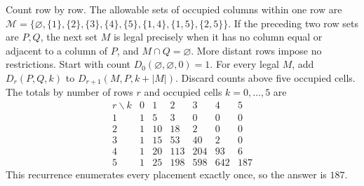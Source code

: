 Count row by row. The allowable sets of occupied columns within one row are $\mathcal M=\{\varnothing,\{1\},\{2\},\{3\},\{4\},\{5\},\{1,4\},\{1,5\},\{2,5\}\}$. If the preceding two row sets are $P,Q$, the next set $M$ is legal precisely when it has no column equal or adjacent to a column of $P$, and $M\cap Q=\varnothing$. More distant rows impose no restrictions. Start with count $D_0(\varnothing,\varnothing,0)=1$. For every legal $M$, add $D_r(P,Q,k)$ to $D_{r+1}(M,P,k+|M|)$. Discard counts above five occupied cells. The totals by number of rows $r$ and occupied cells $k=0,\ldots,5$ are \[\begin{array}{c|rrrrrr}r\backslash k&0&1&2&3&4&5\\1&1&5&3&0&0&0\\2&1&10&18&2&0&0\\3&1&15&53&40&2&0\\4&1&20&113&204&93&6\\5&1&25&198&598&642&187\end{array}\] This recurrence enumerates every placement exactly once, so the answer is $\boxed{187}$.
